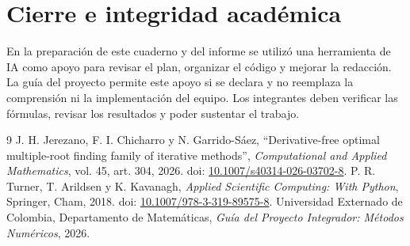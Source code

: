 \documentclass[10pt,a4paper]{article}
\begin{document}
\section{Cierre e integridad acad\'emica}
En la preparación de este cuaderno y del informe se utilizó una herramienta de IA como apoyo para revisar el plan, organizar el código y mejorar la redacción. La guía del proyecto \cite{guia} permite este apoyo si se declara y no reemplaza la comprensión ni la implementación del equipo. Los integrantes deben verificar las fórmulas, revisar los resultados y poder sustentar el trabajo.
\begin{thebibliography}{9}\small
{} J. H. Jerezano, F. I. Chicharro y N. Garrido-S\'aez, ``Derivative-free optimal multiple-root finding family of iterative methods'', \emph{Computational and Applied Mathematics}, vol. 45, art. 304, 2026. doi: \href{https://doi.org/10.1007/s40314-026-03702-8}{10.1007/s40314-026-03702-8}.
 P. R. Turner, T. Arildsen y K. Kavanagh, \emph{Applied Scientific Computing: With Python}, Springer, Cham, 2018. doi: \href{https://doi.org/10.1007/978-3-319-89575-8}{10.1007/978-3-319-89575-8}.
 Universidad Externado de Colombia, Departamento de Matemáticas, \emph{Guía del Proyecto Integrador: M\'etodos Numéricos}, 2026.
\end{thebibliography}
\end{document}
